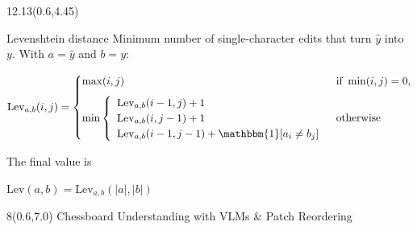 \documentclass{article}
\newcommand{\desc}[1]{{\color{grey}\normalsize #1}\par}
\begin{document}
\begin{textblock}{12.13}(0.6,4.45)
\begin{metric}[height=2.3in]{Levenshtein distance}
  \desc{Minimum number of single-character edits that turn $\hat{y}$ into $y$. With $a = \hat{y}$ and $b = y$:}
  \vfill
  \begin{minipage}[c]{8.3in}
  \[
  \mathrm{Lev}_{a,b}(i,j) =
  \begin{cases}
  \max(i,j) & \text{if } \min(i,j) = 0, \\[6pt]
  \min
  \left\{
  \begin{array}{l}
  \mathrm{Lev}_{a,b}(i-1,j) + 1 \\
  \mathrm{Lev}_{a,b}(i,j-1) + 1 \\
  \mathrm{Lev}_{a,b}(i-1,j-1) + \mathbbm{1}\!\left[a_i \neq b_j\right]
  \end{array}
  \right.
  & \text{otherwise}
  \end{cases}
  \]
  \end{minipage}\hfill
  \begin{minipage}[c]{3.2in}
  The final value is\par\vspace{4pt}
  $\mathrm{Lev}(a,b) = \mathrm{Lev}_{a,b}(|a|,|b|)$
  \end{minipage}
  \vfill
\end{metric}
\end{textblock}

\begin{textblock}{8}(0.6,7.0)
  {\color{grey}\fontsize{10}{12}\selectfont Chessboard Understanding with VLMs \& Patch Reordering}
\end{textblock}

\mbox{}
\end{document}
